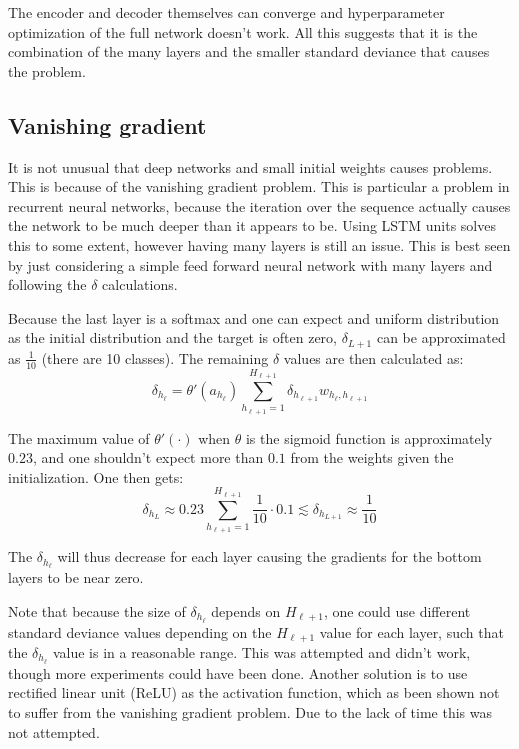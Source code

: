 The encoder and decoder themselves can converge and hyperparameter optimization of the full network doesn't work. All this suggests that it is the combination of the many layers and the smaller standard deviance that causes the problem.

\subsection{Vanishing gradient}
It is not unusual that deep networks and small initial weights causes problems. This is because of the vanishing gradient problem. This is particular a problem in recurrent neural networks, because the iteration over the sequence actually causes the network to be much deeper than it appears to be. Using LSTM units solves this to some extent, however having many layers is still an issue. This is best seen by just considering a simple feed forward neural network with many layers and following the $\delta$ calculations.

Because the last layer is a softmax and one can expect and uniform distribution as the initial distribution and the target is often zero, $\delta_{L+1}$ can be approximated as $\frac{1}{10}$ (there are 10 classes). The remaining $\delta$ values are then calculated as:
\begin{equation}
\delta_{h_\ell} = \theta'(a_{h_\ell}) \sum_{h_{\ell+1} = 1}^{H_{\ell+1}} \delta_{h_{\ell+1}} w_{h_\ell, h_{\ell+1}}
\end{equation}

The maximum value of $\theta'(\cdot)$ when $\theta$ is the sigmoid function is approximately $0.23$, and one shouldn't expect more than $0.1$ from the weights given the initialization. One then gets:
\begin{equation}
\delta_{h_L} \approx 0.23 \sum_{h_{\ell+1} = 1}^{H_{\ell+1}} \frac{1}{10} \cdot 0.1 \lesssim \delta_{h_{L+1}} \approx \frac{1}{10}
\end{equation}

The $\delta_{h_\ell}$ will thus decrease for each layer causing the gradients for the bottom layers to be near zero.

Note that because the size of $\delta_{h_\ell}$ depends on $H_{\ell+1}$, one could use different standard deviance values depending on the $H_{\ell+1}$ value for each layer, such that the $\delta_{h_\ell}$ value is in a reasonable range. This was attempted and didn't work, though more experiments could have been done. Another solution is to use rectified linear unit (ReLU) as the activation function, which as been shown not to suffer from the vanishing gradient problem. Due to the lack of time this was not attempted.

